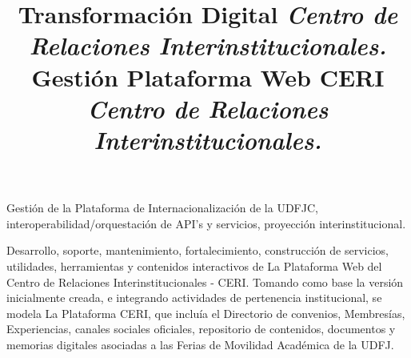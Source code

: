 \documentclass[overlapped,line,final]{res}
\begin{document}
\begin{resume}
\title{\bf Transformación Digital
	\newline \em Centro de Relaciones Interinstitucionales.
}
\begin{position}
Gestión de la Plataforma de Internacionalización de la UDFJC, interoperabilidad/orquestación de API's y servicios, proyección interinstitucional.
\end{position} 


\title{\bf Gestión Plataforma Web CERI
	\newline \em Centro de Relaciones Interinstitucionales.
}
\begin{position}
Desarrollo, soporte, mantenimiento, fortalecimiento, construcción de servicios, utilidades, herramientas y contenidos interactivos de La Plataforma Web del Centro de Relaciones Interinstitucionales - CERI. Tomando como base la versión inicialmente creada, e integrando actividades de pertenencia institucional, se modela La Plataforma CERI, que incluía el Directorio de convenios, Membresías, Experiencias, canales sociales oficiales, repositorio de contenidos, documentos y memorias digitales asociadas a las Ferias de Movilidad Académica de la UDFJ.
\end{position} 




\end{resume}
\end{document}
